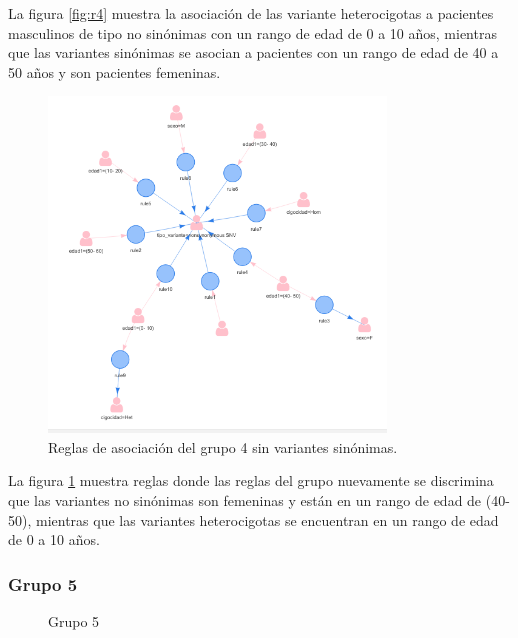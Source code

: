 La figura \ref{fig:r4} muestra la asociación de las variante heterocigotas a pacientes masculinos de tipo no sinónimas con un rango de edad de 0 a 10 años, mientras que las variantes sinónimas se asocian a pacientes con un rango de edad de 40 a 50 años y son pacientes femeninas. 

\begin{figure}[H]
	\centering
	\includegraphics[width=0.8\textwidth]{Kap4/reglas4_2}
	\caption{Reglas de asociación del grupo 4 sin variantes sinónimas.} \label{fig:re4}
\end{figure}

La figura \ref{fig:re4} muestra reglas  donde las reglas del grupo nuevamente se discrimina que las variantes no sinónimas son femeninas y están en un rango de edad de (40-50), mientras que las variantes heterocigotas se encuentran en un rango de edad de 0 a 10 años. 

\subsubsection*{Grupo 5}

\begin{figure}[H]
	\centering
	\caption{Grupo 5} \label{fig:c5}
\end{figure}

